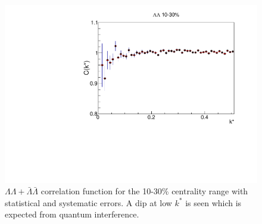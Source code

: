 \begin{figure}[hbtp]
\includegraphics[width=36pc]{Figures/CFs/2016-8-30-CFLLAA1030CombinedSystematicsMaximum.pdf}
\caption[$\Lambda\Lambda + \bar{\Lambda}\bar{\Lambda}$ correlation function for the 10-30\% centrality range]{$\Lambda\Lambda + \bar{\Lambda}\bar{\Lambda}$ correlation function for the 10-30\% centrality range with statistical and systematic errors.  
A dip at low $k^*$ is seen which is expected from quantum interference.}
\label{fig:CFLamLamALamALam1030STAR}
\end{figure}


